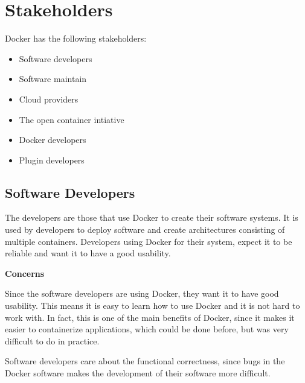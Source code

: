 
\section{Stakeholders}
\label{sec:stakeholders}

Docker has the following stakeholders:
\begin{itemize}
\item Software developers
\item Software maintain
\item Cloud providers
\item The open container intiative
\item Docker developers
\item Plugin developers
\end{itemize}

\subsection*{Software Developers}
The developers are those that use Docker to create their software systems. It is used by developers to deploy software and create architectures consisting of multiple containers. Developers using Docker for their system, expect it to be reliable and want it to have a good usability. 

\textbf{Concerns}
\begin{description}[labelindent=25pt,style=multiline,leftmargin=4.0cm,font=\normalfont\itshape]

\item[Usability] Since the software developers are using Docker, they want it to have good usability. This means it is easy to learn how to use Docker and it is not hard to work with. In fact, this is one of the main benefits of Docker, since it makes it easier to containerize applications, which could be done before, but was very difficult to do in practice.


\item[Functional correctness] Software developers care about the functional correctness, since bugs in the Docker software makes the development of their software more difficult. 

\end{description}

